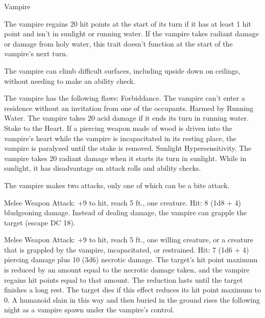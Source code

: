 \begin{monsterbox}{Vampire}
\begin{monsteraction}
\end{monsteraction}
\begin{monsteraction}[Regeneration]
The vampire regains 20 hit points at the start of its turn if it has at least 1 hit point and isn't in sunlight or running water. If the vampire takes radiant damage or damage from holy water, this trait doesn't function at the start of the vampire's next turn.
\end{monsteraction}
\begin{monsteraction}
The vampire can climb difficult surfaces, including upside down on ceilings, without needing to make an ability check.
\end{monsteraction}
\begin{monsteraction}
The vampire has the following flaws:
Forbiddance. The vampire can't enter a residence without an invitation from one of the occupants.
Harmed by Running Water. The vampire takes 20 acid damage if it ends its turn in running water.
Stake to the Heart. If a piercing weapon made of wood is driven into the vampire's heart while the vampire is incapacitated in its resting place, the vampire is paralyzed until the stake is removed.
Sunlight Hypersensitivity. The vampire takes 20 radiant damage when it starts its turn in sunlight. While in sunlight, it has disadvantage on attack rolls and ability checks.
\end{monsteraction}
\begin{monsteraction}
The vampire makes two attacks, only one of which can be a bite attack.
\end{monsteraction}
\begin{monsteraction}
Melee Weapon Attack: +9 to hit, reach 5 ft., one creature. Hit: 8 (1d8 + 4) bludgeoning damage. Instead of dealing damage, the vampire can grapple the target (escape DC 18).
\end{monsteraction}
\begin{monsteraction}
Melee Weapon Attack: +9 to hit, reach 5 ft., one willing creature, or a creature that is grappled by the vampire, incapacitated, or restrained. Hit: 7 (1d6 + 4) piercing damage plus 10 (3d6) necrotic damage. The target's hit point maximum is reduced by an amount equal to the necrotic damage taken, and the vampire regains hit points equal to that amount. The reduction lasts until the target finishes a long rest. The target dies if this effect reduces its hit point maximum to 0. A humanoid slain in this way and then buried in the ground rises the following night as a vampire spawn under the vampire's control.

\end{monsteraction}
\end{monsterbox}
